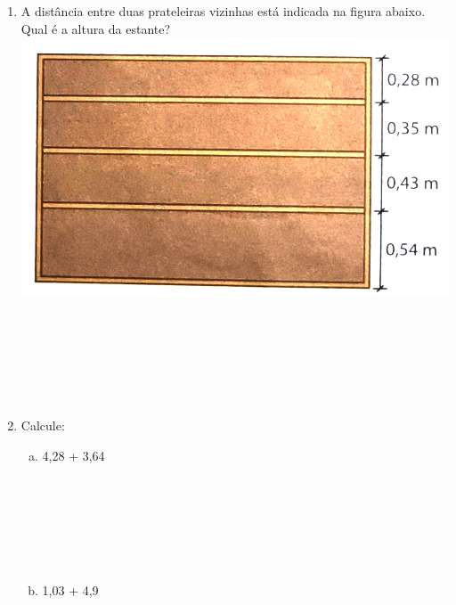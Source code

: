 \documentclass[a4paper,14pt]{article}
\begin{document}
\begin{multicols}{2}
\begin{enumerate}
    			\begin{itemize}
    				\item distância de $A$ até $C$: 105,2 km;
    				\item distância de $B$ até $D$: 76,45 km;
    				\item distância de $C$ até $B$: 30,7 km. \\\\\\\\\\\\\\\\
    			\end{itemize}
    			\item A distância entre duas prateleiras vizinhas está indicada na figura abaixo. Qual é a altura da estante?
    			\includegraphics[width=1.1\linewidth]{6FMA56_imagens/imagem2} \\\\\\\\\\\\\\
    			\item Calcule:
    			\begin{enumerate}[a)]
    				\item 4,28 + 3,64 \\\\\\\\\\\\\\
    				\item 1,03 + 4,9 \\\\\\\\\\\\\\

\end{enumerate}
\end{enumerate}
\end{multicols}
\end{document}
